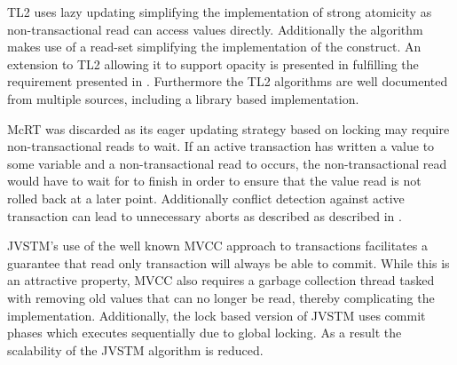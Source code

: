 TL2 uses lazy updating simplifying the implementation of strong atomicity as non-transactional read can access values directly. Additionally the algorithm makes use of a read-set simplifying the implementation of the  construct. An extension to TL2 allowing it to support opacity is presented in \cite[p. 107]{harris2010transactional} fulfilling the requirement presented in . Furthermore the TL2 algorithms are well documented from multiple sources, including a library based implementation\cite{dice2006transactional}\cite[p. 438]{herlihy2012art}\cite[p. 106]{harris2010transactional}.

McRT was discarded as its eager updating strategy based on locking may require non-transactional reads to wait. If an active transaction  has written a value to some variable  and a non-transactional read to  occurs, the non-transactional read would have to wait for  to finish in order to ensure that the value read is not rolled back at a later point. Additionally conflict detection against active transaction can lead to unnecessary aborts as described as described in .

JVSTM's use of the well known \ac{MVCC} approach to transactions facilitates a guarantee that read only transaction will always be able to commit. While this is an attractive property, \ac{MVCC} also requires a garbage collection thread tasked with removing old values that can no longer be read, thereby complicating the implementation. Additionally, the lock based version of JVSTM uses commit phases which executes sequentially due to global locking. As a result the scalability of the  JVSTM algorithm is reduced\cite[p. 86]{cachopo2007development}. 


